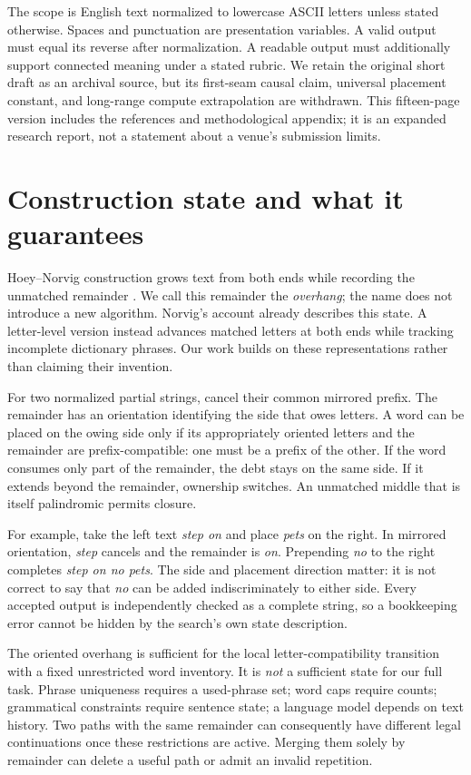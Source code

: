 \documentclass[11pt,letterpaper]{article}
\newcommand{\pageend}{\clearpage}
\begin{document}
The scope is English text normalized to lowercase ASCII letters unless stated otherwise. Spaces and punctuation are presentation variables. A valid output must equal its reverse after normalization. A readable output must additionally support connected meaning under a stated rubric. We retain the original short draft as an archival source, but its first-seam causal claim, universal placement constant, and long-range compute extrapolation are withdrawn. This fifteen-page version includes the references and methodological appendix; it is an expanded research report, not a statement about a venue's submission limits.
\pageend

\section{Construction state and what it guarantees}
\label{sec:state}
Hoey--Norvig construction grows text from both ends while recording the unmatched remainder \citep{norvig2002palindrome}. We call this remainder the \emph{overhang}; the name does not introduce a new algorithm. Norvig's account already describes this state. A letter-level version instead advances matched letters at both ends while tracking incomplete dictionary phrases. Our work builds on these representations rather than claiming their invention.

For two normalized partial strings, cancel their common mirrored prefix. The remainder has an orientation identifying the side that owes letters. A word can be placed on the owing side only if its appropriately oriented letters and the remainder are prefix-compatible: one must be a prefix of the other. If the word consumes only part of the remainder, the debt stays on the same side. If it extends beyond the remainder, ownership switches. An unmatched middle that is itself palindromic permits closure.

For example, take the left text \emph{step on} and place \emph{pets} on the right. In mirrored orientation, \emph{step} cancels and the remainder is \emph{on}. Prepending \emph{no} to the right completes \emph{step on no pets}. The side and placement direction matter: it is not correct to say that \emph{no} can be added indiscriminately to either side. Every accepted output is independently checked as a complete string, so a bookkeeping error cannot be hidden by the search's own state description.

The oriented overhang is sufficient for the local letter-compatibility transition with a fixed unrestricted word inventory. It is \emph{not} a sufficient state for our full task. Phrase uniqueness requires a used-phrase set; word caps require counts; grammatical constraints require sentence state; a language model depends on text history. Two paths with the same remainder can consequently have different legal continuations once these restrictions are active. Merging them solely by remainder can delete a useful path or admit an invalid repetition.
\end{document}
